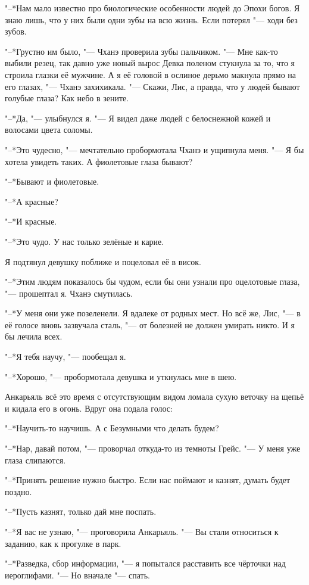 \documentclass[a4paper,10pt]{book}
\newcommand{\ldotst}{\so{...}\xspace}
\begin{document}
"--*Нам мало известно про биологические особенности людей до Эпохи богов. Я 
знаю лишь, что у них были одни зубы на всю жизнь. Если потерял "--- ходи без 
зубов.

"--*Грустно им было, "--- Чханэ проверила зубы пальчиком. "--- Мне как-то 
выбили 
резец, так давно уже новый вырос\ldotst Девка поленом стукнула за то, что я 
строила глазки её мужчине. А я её головой в ослиное дерьмо макнула\ldotst прямо 
на его глазах, "--- Чханэ захихикала. "--- Скажи, Лис, а правда, что у людей 
бывают голубые глаза? Как небо в зените.

"--*Да, "--- улыбнулся я. "--- Я видел даже людей с белоснежной кожей и 
волосами 
цвета соломы.

"--*Это чудесно, "--- мечтательно пробормотала Чханэ и ущипнула меня. "--- Я бы 
хотела увидеть таких. А фиолетовые глаза бывают?

"--*Бывают и фиолетовые.

"--*А красные?

"--*И красные.

"--*Это чудо. У нас только зелёные и карие.

Я подтянул девушку поближе и поцеловал её в висок.

"--*Этим людям показалось бы чудом, если бы они узнали про оцелотовые глаза, 
"--- прошептал я. Чханэ смутилась.

"--*У меня они уже позеленели. Я вдалеке от родных мест. Но всё же, Лис, "--- в 
её голосе вновь зазвучала сталь, "--- от болезней не должен умирать никто. И я 
бы лечила всех.

"--*Я тебя научу, "--- пообещал я.

"--*Хорошо, "--- пробормотала девушка и уткнулась мне в шею.

Анкарьяль всё это время с отсутствующим видом ломала сухую веточку на щепьё и 
кидала его в огонь. Вдруг она подала голос:

"--*Научить-то научишь. А с Безумными что делать будем?

"--*Нар, давай потом, "--- проворчал откуда-то из темноты Грейс. "--- У меня 
уже 
глаза слипаются.

"--*Принять решение нужно быстро. Если нас поймают и казнят, думать будет 
поздно.

"--*Пусть казнят, только дай мне поспать.

"--*Я вас не узнаю, "--- проговорила Анкарьяль. "--- Вы стали относиться к 
заданию, как к прогулке в парк.

"--*Разведка, сбор информации, "--- я попытался расставить все чёрточки над 
иероглифами. "--- Но вначале "--- спать.
\end{document}
